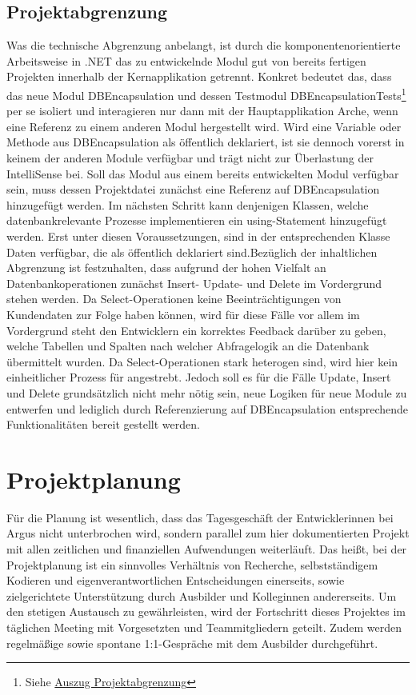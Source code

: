 \documentclass[11pt,toc=sectionentrywithoutdots, 
headheight=44pt, headings=optiontoheadandtoc, hyperfootnotes=false, hypertexnames=false]{scrartcl}
\begin{document}
\subsection{Projektabgrenzung}
Was die technische Abgrenzung anbelangt, ist durch die komponentenorientierte Arbeitsweise in .NET das zu entwickelnde Modul gut von bereits fertigen Projekten innerhalb der Kernapplikation getrennt. Konkret bedeutet das, dass das neue Modul \glqq DBEncapsulation\grqq{} und dessen Testmodul \glqq DBEncapsulationTests\grqq{}\footnote{Siehe \hyperref[fig:Assemblies]{Auszug Projektabgrenzung}} per se isoliert und interagieren nur dann mit der Hauptapplikation Arche, wenn eine Referenz zu einem anderen Modul hergestellt wird. Wird eine Variable oder Methode aus DBEncapsulation als öffentlich deklariert, ist sie dennoch vorerst in keinem der anderen Module verfügbar und trägt nicht zur Überlastung der \gls{IntelliSense} bei. Soll das Modul aus einem bereits entwickelten Modul verfügbar sein, muss dessen Projektdatei zunächst eine Referenz auf DBEncapsulation hinzugefügt werden. Im nächsten Schritt kann denjenigen Klassen, welche datenbankrelevante Prozesse implementieren ein \glqq using\grqq{}-Statement hinzugefügt werden. Erst unter diesen Voraussetzungen, sind in der entsprechenden Klasse Daten verfügbar, die als öffentlich deklariert sind.\newline Bezüglich der inhaltlichen Abgrenzung ist festzuhalten, dass aufgrund der hohen Vielfalt an Datenbankoperationen zunächst Insert- Update- und Delete im Vordergrund stehen werden. Da Select-Operationen keine Beeinträchtigungen von Kundendaten zur Folge haben können, wird für diese Fälle vor allem im Vordergrund steht den Entwicklern ein korrektes Feedback darüber zu geben, welche Tabellen und Spalten nach welcher Abfragelogik an die Datenbank übermittelt wurden. Da Select-Operationen stark heterogen sind, wird hier kein einheitlicher Prozess für angestrebt. Jedoch soll es für die Fälle Update, Insert und Delete grundsätzlich nicht mehr nötig sein, neue Logiken für neue Module zu entwerfen und lediglich durch Referenzierung auf DBEncapsulation entsprechende Funktionalitäten bereit gestellt werden.

\section{Projektplanung}
Für die Planung ist wesentlich, dass das Tagesgeschäft der Entwicklerinnen bei Argus nicht unterbrochen wird, sondern parallel zum hier dokumentierten Projekt mit allen zeitlichen und finanziellen Aufwendungen weiterläuft. Das heißt, bei der Projektplanung ist ein sinnvolles Verhältnis von Recherche, selbstständigem Kodieren und eigenverantwortlichen Entscheidungen einerseits, sowie zielgerichtete Unterstützung durch Ausbilder und Kolleginnen andererseits. Um den stetigen Austausch zu gewährleisten, wird der Fortschritt dieses Projektes im täglichen Meeting mit Vorgesetzten und Teammitgliedern geteilt. Zudem werden regelmäßige sowie spontane 1:1-Gespräche mit dem Ausbilder durchgeführt.
\end{document}

